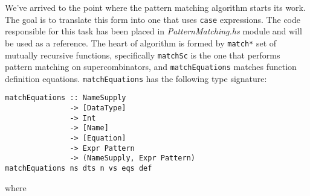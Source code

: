 \documentclass[a4paper]{report}
\begin{document}
We've arrived to the point where the pattern matching algorithm starts its
work. The goal is to translate this form into one that uses \texttt{case}
expressions. The code responsible for this task has been placed in
\textit{PatternMatching.hs} module and will be used as a reference. The heart
of algorithm is formed by \texttt{match*} set of mutually recursive functions,
specifically \texttt{matchSc} is the one that performs pattern matching on
supercombinators, and \texttt{matchEquations} matches function definition
equations. \texttt{matchEquations} has the following type signature:

\begin{lstlisting}
matchEquations :: NameSupply
               -> [DataType]
               -> Int
               -> [Name]
               -> [Equation]
               -> Expr Pattern
               -> (NameSupply, Expr Pattern)
matchEquations ns dts n vs eqs def
\end{lstlisting}
where
\end{document}
